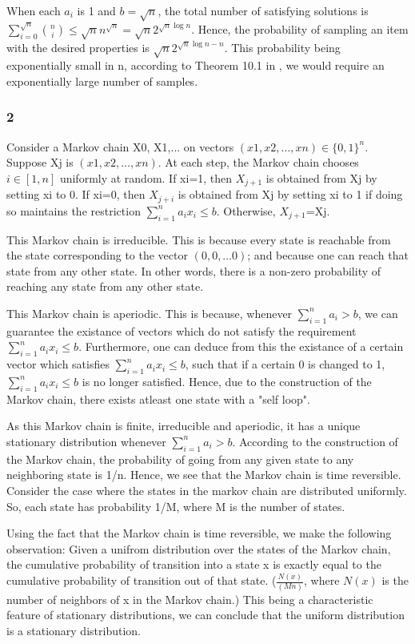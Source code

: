 \documentclass[10pt]{amsart}
\theoremstyle{remark}
\begin{document}
When each $a_{i}$ is 1 and $b=\sqrt{n}$, the total number of satisfying solutions is $\sum_{i=0}^{\sqrt{n}} \binom{n}{i} \leq \sqrt{n}n^{\sqrt{n}} = \sqrt{n}2^{\sqrt{n}\log n }$. Hence, the probability of sampling an item with the desired properties is $\sqrt{n}2^{\sqrt{n}\log n  - n}$. This probability being exponentially small in n, according to Theorem 10.1 in \cite{mitzenmacherUpfal}, we would require an exponentially large number of samples.

\subsubsection{2}

Consider a Markov chain X0, X1,... on vectors $(x1, x2,\dots, xn)\in\{0, 1\}^{n}$. Suppose Xj is $(x1, x2,\dots, xn)$. At each step, the Markov chain chooses $i\in[1, n]$ uniformly at random. If xi=1, then $X_{j+1}$ is obtained from Xj by setting xi to 0. If xi=0, then $X_{j+i}$ is obtained from Xj by setting xi to 1 if doing so maintains the restriction $\sum_{i=1}^{n}a_{i}x_{i}\leq b$. Otherwise, $X_{j+1}$=Xj.

This Markov chain is irreducible. This is because every state is reachable from the state corresponding to the vector $(0, 0, \dots 0)$; and because one can reach that state from any other state. In other words, there is a non-zero probability of reaching any state from any other state.

This Markov chain is aperiodic. This is because, whenever $\sum_{i=1}^{n}a_{i}> b$, we can guarantee the existance of vectors which do not satisfy the requirement $\sum_{i=1}^{n}a_{i}x_{i}\leq b$. Furthermore, one can deduce from this the existance of a certain vector which satisfies $\sum_{i=1}^{n}a_{i}x_{i}\leq b$, such that if a certain 0 is changed to 1, $\sum_{i=1}^{n}a_{i}x_{i}\leq b$ is no longer satisfied. Hence, due to the construction of the Markov chain, there exists atleast one state with a "self loop".

As this Markov chain is finite, irreducible and aperiodic, it has a unique stationary distribution whenever $\sum_{i=1}^{n}a_{i}> b$. According to the construction of the Markov chain, the probability of going from any given state to any neighboring state is 1/n. Hence, we see that the Markov chain is time reversible. Consider the case where the states in the markov chain are distributed uniformly. So, each state has probability 1/M, where M is the number of states.

Using the fact that the Markov chain is time reversible, we make the following observation: Given a unifrom distribution over the states of the Markov chain, the cumulative probability of transition into a state x is exactly equal to the cumulative probability of transition out of that state. ($\frac{N(x)}{(Mn)}$, where $N(x)$ is the number of neighbors of x in the Markov chain.) This being a characteristic feature of stationary distributions, we can conclude that the uniform distribution is a stationary distribution.
\end{document}
